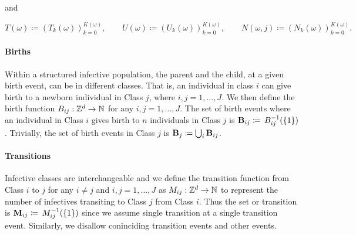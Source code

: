 \documentclass[11pt,reqno,final]{amsart}\usepackage[]{graphicx}\usepackage[]{color}
\begin{document}
and 

\begin{equation}
  T(\omega)\coloneqq\left(T_k(\omega)\right)^{K(\omega)}_{k=0},\qquad U(\omega)\coloneqq\left(U_k(\omega)\right)^{K(\omega)}_{k=0},\qquad N(\omega,j)\coloneqq\left(N_k(\omega)\right)^{K(\omega)}_{k=0}.
\end{equation}

% 
% 
% 

\paragraph{Births}
Within a structured infective population, the parent and the child, at a given birth event, can be in different classes. That is, an individual in class $i$ can give birth to a newborn individual in Class $j$, where $i,j=1,\dots,J$. We then define the birth function $B_{ij}:\mathbb{Z}^d\to\mathbb{N}$ for any $i,j=1,\dots,J$. The set of birth events where an individual in Class $i$ gives birth to $n$ individuals in Class $j$ is $\mathbf{B}_{ij}\coloneqq\,B_{ij}^{-1}(\{1\})$. Trivially, the set of birth events in Class $j$ is $\mathbf{B}_j\coloneqq\bigcup_{i}\mathbf{B}_{ij}$.


\paragraph{Transitions}
Infective classes are interchangeable and we define the transition function from Class $i$ to $j$ for any $i\neq j$ and $i,j=1,\dots,J$ as $M_{ij}:\mathbb{Z}^d\to\mathbb{N}$ to represent the number of infectives transiting to Class $j$ from Class $i$. Thus the set or transition is $\mathbf{M}_{ij}\coloneqq\,M^{-1}_{ij}(\{1\})$ since we assume single transition at a single transition event. Similarly, we disallow coninciding transition events and other events. 
\end{document}
